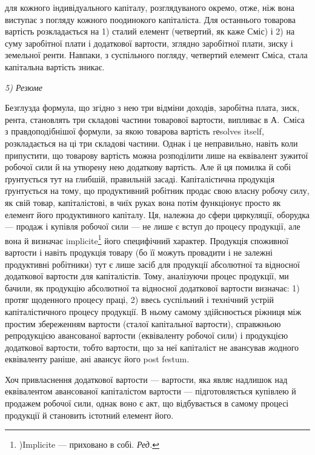 \parcont{}  %
для кожного індивідуального капіталу, розглядуваного окремо, отже, ніж
вона виступає з погляду кожного поодинокого капіталіста. Для останнього
товарова вартість розкладається на 1) сталий елемент (четвертий,
як каже Сміс) і 2) на суму заробітної плати і додаткової вартости, зглядно
заробітної плати, зиску і земельної ренти. Навпаки, з суспільного погляду,
четвертий елемент Сміса, стала капітальна вартість зникає.

                               \emph{5) Резюме}

Безглузда формула, що згідно з нею три відміни доходів, заробітна
плата, зиск, рента, становлять три складові частини товарової вартости,
випливає в А.~Сміса з правдоподібнішої формули, за якою товарова
вартість rеsolves itself, розкладається на ці три складові частини. Однак
і це неправильно, навіть коли припустити, що товарову вартість можна
розподілити лише на еквівалент зужитої робочої сили й на утворену
нею додаткову вартість. Але й ця помилка й собі ґрунтується тут на
глибшій, правильній засаді. Капіталістична продукція ґрунтується на тому,
що продуктивний робітник продає свою власну робочу силу, як свій
товар, капіталістові, в чиїх руках вона потім функціонує просто як елемент
його продуктивного капіталу. Ця, належна до сфери циркуляції,
оборудка — продаж і купівля робочої сили — не лише є вступ до процесу
продукції, але вона й визначає implicite\footnote*{
)Implicite — приховано в собі. \emph{Ред.}
} його специфічний характер.
Продукція споживної вартости і навіть продукція товару (бо її можуть
провадити і не залежні продуктивні робітники) тут є лише засіб для продукції
абсолютної та відносної додаткової вартости для капіталістів. Тому, аналізуючи
процес продукції, ми бачили, як продукцію абсолютної та відносної
додаткової вартости визначає: 1) протяг щоденного процесу праці,
2) ввесь суспільний і технічний устрій капіталістичного процесу продукції.
В ньому самому здійснюється ріжниця між простим збереженням вартости
(сталої капітальної вартости), справжньою репродукцією авансованої вартости
(еквіваленту робочої сили) і продукцією додаткової вартости, тобто
вартости, що за неї капіталіст не авансував жодного еквіваленту раніше,
ані авансує його post festum.

Хоч привласнення додаткової вартости — вартости, яка являє надлишок
над еквівалентом авансованої капіталістом вартости — підготовляється
купівлею й продажем робочої сили, однак воно є акт, що відбувається
в самому процесі продукції й становить істотний елемент його.

